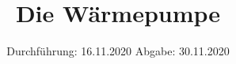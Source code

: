 

\subject{V206}
\title{Die Wärmepumpe}
\date{%
  Durchführung: 16.11.2020
  \hspace{3em}
  Abgabe: 30.11.2020
}



\maketitle
\thispagestyle{empty}
\tableofcontents
\newpage








\printbibliography{}


